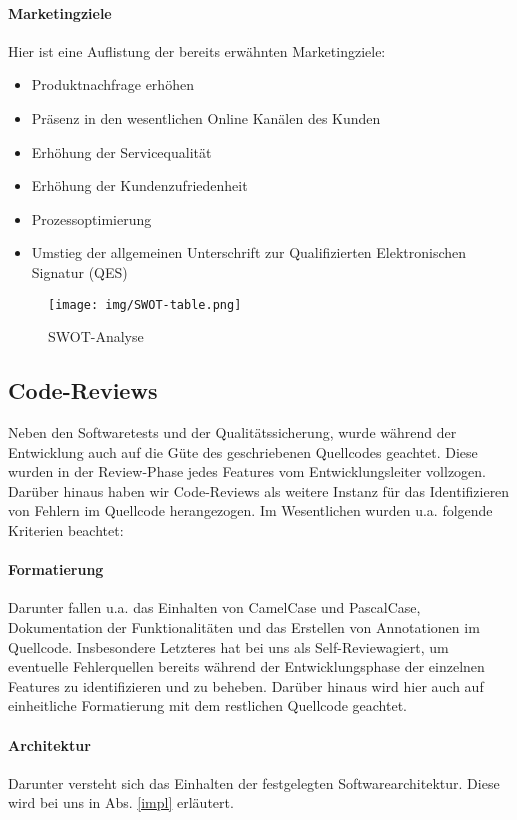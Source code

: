 \documentclass[12pt,a4paper]{scrartcl}
\begin{document}
\paragraph{Marketingziele}
Hier ist eine Auflistung der bereits erwähnten Marketingziele:
\begin{itemize}
    \item Produktnachfrage erhöhen
    \item Präsenz in den wesentlichen Online Kanälen des Kunden
    \item Erhöhung der Servicequalität
    \item Erhöhung der Kundenzufriedenheit
    \item Prozessoptimierung
    \item Umstieg der allgemeinen Unterschrift zur Qualifizierten Elektronischen Signatur (QES)
\end{itemize}



\begin{figure}[H]
	\centering
	\texttt{[image: img/SWOT-table.png]}
	\caption{SWOT-Analyse}
	\label{fig:use-case}
\end{figure}


\subsection{Code-Reviews}
Neben den Softwaretests und der Qualitätssicherung, wurde während der Entwicklung auch auf die Güte des geschriebenen Quellcodes geachtet.
Diese wurden in der Review-Phase jedes Features vom Entwicklungsleiter vollzogen.
Darüber hinaus haben wir Code-Reviews als weitere Instanz für das Identifizieren von Fehlern im Quellcode herangezogen.
Im Wesentlichen wurden u.a. folgende Kriterien beachtet:

\paragraph{Formatierung}
Darunter fallen u.a. das Einhalten von CamelCase und PascalCase, Dokumentation der Funktionalitäten und das Erstellen von Annotationen im Quellcode.
Insbesondere Letzteres hat bei uns als \glqq Self-Review\grqq  agiert, um eventuelle Fehlerquellen bereits während der Entwicklungsphase der einzelnen Features zu identifizieren und zu beheben.
Darüber hinaus wird hier auch auf einheitliche Formatierung mit dem restlichen Quellcode geachtet.

\paragraph{Architektur}
Darunter versteht sich das Einhalten der festgelegten Softwarearchitektur.
Diese wird bei uns in Abs. \ref{impl} erläutert.
\end{document}

